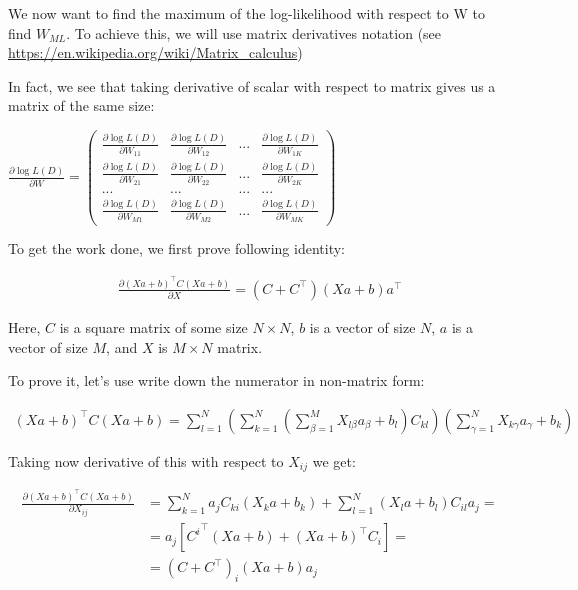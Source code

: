 \documentclass[fleqn]{article}
\begin{document}
We now want to find the maximum of the log-likelihood with respect to W to find $W_{ML}$. To achieve this, we will use matrix derivatives notation (see \url{https://en.wikipedia.org/wiki/Matrix_calculus})

In fact, we see that taking derivative of scalar with respect to matrix gives us a matrix of the same size:

$\frac{\partial \log L(D)}{\partial W} = \begin{pmatrix}
\frac{\partial \log L(D)}{\partial W_{11}} & \frac{\partial \log L(D)}{\partial W_{12}} & ... & \frac{\partial \log L(D)}{\partial W_{1K}} \\
\frac{\partial \log L(D)}{\partial W_{21}} & \frac{\partial \log L(D)}{\partial W_{22}} & ... & \frac{\partial \log L(D)}{\partial W_{2K}} \\
... & ... & ... & ... \\
\frac{\partial \log L(D)}{\partial W_{M1}} & \frac{\partial \log L(D)}{\partial W_{M2}} & ... & \frac{\partial \log L(D)}{\partial W_{MK}}
\end{pmatrix}$


To get the work done, we first prove following identity:

\begin{align}
\frac{\partial (Xa + b)^\top C (Xa + b)}{\partial X} = (C + C^\top)(Xa + b)a^\top
\end{align}

Here, $C$ is a square matrix of some size $N \times N$, $b$ is a vector of size $N$, $a$ is a vector of size $M$, and $X$ is $M \times N$ matrix.  

To prove it, let's use write down the numerator in non-matrix form:

\begin{align}
(Xa + b)^\top C (Xa + b) = \sum\limits_{l=1}^N(\sum\limits_{k=1}^N(\sum\limits_{\beta=1}^MX_{l\beta}a_\beta + b_l)C_{kl})(\sum\limits_{\gamma=1}^NX_{k\gamma}a_\gamma + b_k)
\end{align}

Taking now derivative of this with respect to $X_{ij}$ we get:

\begin{align}
\frac{\partial (Xa + b)^\top C (Xa + b)}{\partial X_{ij}} &= \sum\limits_{k=1}^Na_jC_{ki} (X_ka + b_k) + \sum\limits_{l=1}^N(X_la + b_l)C_{il}a_j = \\ & = a_j[{C^i}^\top(Xa + b) + (Xa + b)^\top C_i] =\\ & = (C + C^\top)_i(Xa + b)a_j
\end{align}
\end{document}
